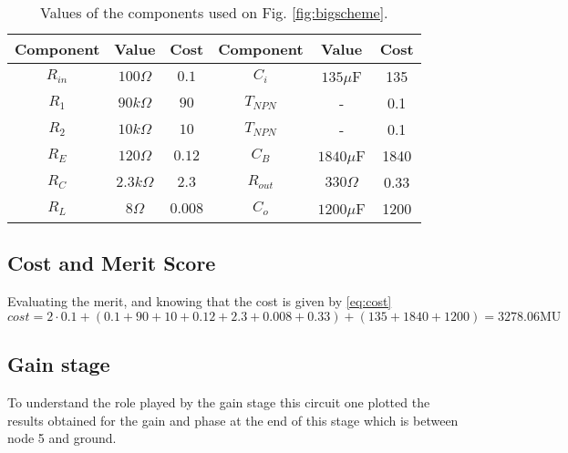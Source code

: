 \begin{table}[H]
    \centering
    \begin{tabular}{|c|c|c|||c|c|c|}
    \hline
        \textbf{Component} & \textbf{Value} & \textbf{Cost} & \textbf{Component} & \textbf{Value} & \textbf{Cost} \\
        \hline
        \hline
        $R_{in}$ & $100\Omega$ & $0.1$ & $C_i$ & $135\mu$F & 135\\
        \hline
        $R_{1}$ & $90k\Omega$ & $90$ & $T_{NPN}$ & - & 0.1\\
        \hline
        $R_{2}$ & $10k\Omega$ & $10$ & $T_{NPN}$ & - & 0.1\\
        \hline
        $R_{E}$ & $120\Omega$ & $0.12$ & $C_B$ & $1840\mu$F & 1840\\
        \hline
        $R_{C}$ & $2.3k\Omega$ & $2.3$ & $R_{out}$ & $330\Omega$ & 0.33\\
        \hline
        $R_{L}$ & $8\Omega$ & $0.008$ & $C_o$ & $1200\mu$F & 1200\\
        \hline
    \end{tabular}
    \caption{Values of the components used on Fig. \ref{fig:bigscheme}.}
    \label{tab:tentativas}
\end{table}


\subsection{Cost and Merit Score}
Evaluating the merit, and knowing that the cost is given by \eqref{eq:cost}
\begin{equation}
    cost = 2 \cdot 0.1 + (0.1+90+10+0.12+2.3+0.008+0.33) + (135+1840+1200) =  3278.06\text{MU}
    \label{eq:cost}
\end{equation}



\subsection{Gain stage}
To understand the role played by the gain stage this circuit one plotted the results obtained for the gain and phase at the end of this stage which is between node 5 and ground.

